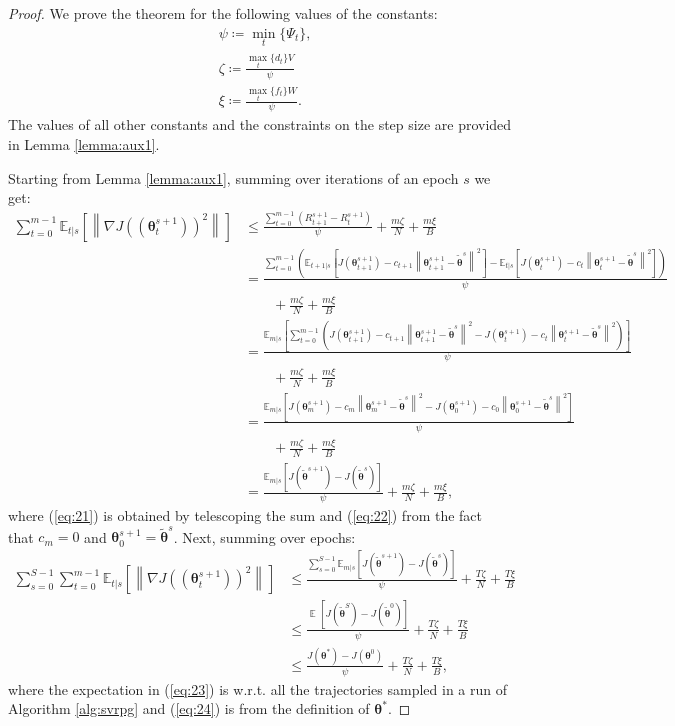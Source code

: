 \documentclass{article}
\makeatletter
\theoremstyle{remark}
\theoremstyle{definition}
\DeclareRobustCommand{\wrt}{w.r.t.\@\xspace}
\DeclareMathOperator*{\EV}{\mathbb{E}}
\newcommand{\EVV}[2][\ppvect \in \ppspace]{\EV_{#1}\left[{#2}\right]}
\newcommand{\norm}[2][\infty]{\left\|#2\right\|_{#1}}
\newcommand{\vtheta}{\boldsymbol{\theta}}
\newcommand{\gradJ}[1]{\nabla J(#1)}
\newcommand{\Ets}[2][t]{\mathbb{E}_{#1\vert s}\left[#2\right]}
\makeatother
\begin{document}
\convergence*
\begin{proof}
We prove the theorem for the following values of the constants:
\begin{align*}
& \psi \coloneqq \min_t\{\Psi_t\}, \\
& \zeta \coloneqq \frac{\max_t\{d_t\}V}{\psi} \\
& \xi \coloneqq \frac{\max_t\{f_t\}W}{\psi}.
\end{align*}
The values of all other constants and the constraints on the step size are provided in Lemma \ref{lemma:aux1}.

Starting from Lemma \ref{lemma:aux1}, summing over iterations of an epoch $s$ we get:
\begin{align}
\sum_{t=0}^{m-1}\Ets{\norm[]{\gradJ{(\vtheta_t^{s+1})}^2}}&\leq
 \frac{\sum_{t=0}^{m-1}\left(R_{t+1}^{s+1} - R_t^{s+1}\right)}{\psi} + \frac{m\zeta}{N} + \frac{m\xi}{B} \nonumber\\
 &= \frac{\sum_{t=0}^{m-1}\left(\Ets[t+1]{J(\vtheta_{t+1}^{s+1}) - c_{t+1}\norm[]{\vtheta_{t+1}^{s+1}-\tilde{\vtheta}^s}^2} - \Ets[t]{J(\vtheta_{t}^{s+1}) - c_{t}\norm[]{\vtheta_{t}^{s+1}-\tilde{\vtheta}^s}^2}\right)}{\psi} \nonumber\\
 &\qquad+ \frac{m\zeta}{N} + \frac{m\xi}{B} \nonumber\\
 &= \frac{\Ets[m]{\sum_{t=0}^{m-1}\left(J(\vtheta_{t+1}^{s+1}) - c_{t+1}\norm[]{\vtheta_{t+1}^{s+1}-\tilde{\vtheta}^s}^2 - J(\vtheta_{t}^{s+1}) - c_{t}\norm[]{\vtheta_{t}^{s+1}-\tilde{\vtheta}^s}^2\right)}}{\psi} \nonumber\\
 &\qquad+ \frac{m\zeta}{N} + \frac{m\xi}{B} \nonumber\\
 &= \frac{\Ets[m]{J(\vtheta_{m}^{s+1}) - c_{m}\norm[]{\vtheta_{m}^{s+1}-\tilde{\vtheta}^s}^2 - J(\vtheta_{0}^{s+1}) - c_{0}\norm[]{\vtheta_{0}^{s+1}-\tilde{\vtheta}^s}^2}}{\psi} \nonumber\\
 &\qquad+ \frac{m\zeta}{N} + \frac{m\xi}{B} \label{eq:21}\\
 &= \frac{\Ets[m]{J(\tilde{\vtheta}^{s+1}) - J(\tilde{\vtheta}^{s})}}{\psi} + \frac{m\zeta}{N} + \frac{m\xi}{B}, \label{eq:22}
 \end{align}
where (\ref{eq:21}) is obtained by telescoping the sum and (\ref{eq:22}) from the fact that $c_m=0$ and $\vtheta_0^{s+1}=\tilde{\vtheta}^s$.
Next, summing over epochs:
\begin{align}
\sum_{s=0}^{S-1}\sum_{t=0}^{m-1}\Ets{\norm[]{\gradJ{(\vtheta_t^{s+1})}^2}}&\leq
\frac{\sum_{s=0}^{S-1}\Ets[m]{J(\tilde{\vtheta}^{s+1}) - J(\tilde{\vtheta}^{s})}}{\psi} + \frac{T\zeta}{N} + \frac{T\xi}{B} \nonumber\\
%
&\leq
\frac{\EVV[]{J(\tilde{\vtheta}^{S}) - J(\tilde{\vtheta}^{0})}}{\psi} + \frac{T\zeta}{N} + \frac{T\xi}{B}
 \label{eq:23}\\
%
&\leq
\frac{J(\vtheta^*) - J(\vtheta^0)}{\psi} + \frac{T\zeta}{N} + \frac{T\xi}{B}, \label{eq:24}
\end{align}
where the expectation in (\ref{eq:23}) is \wrt all the trajectories sampled in a run of Algorithm \ref{alg:svrpg} and (\ref{eq:24}) is from the definition of $\vtheta^*$.
 

\end{proof}
\end{document}
